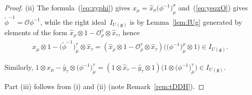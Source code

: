 \documentclass[pdftex]{sigma}
\def\gg{\mathfrak{g}}
\def\OO{\mathcal{O}}
\numberwithin{equation}{section}
\begin{document}
\begin{proof}
(ii) The formula~(\ref{eq:xyphi}) gives $x_\mu = \hat{x}_\sigma \big(\phi^{-1}\big)^\sigma_\mu$ and~(\ref{eq:yeqxO}) gives $\tilde\phi^{-1} = \mathcal{O}\phi^{-1}$, while the right ideal~$I_{U(\gg)}$ is by Lemma~\ref{lem:IUg} generated by elements of the form $\hat{x}_\rho\otimes 1 - \mathcal{O}^\tau_\rho\otimes\hat{x}_\tau$, hence
\begin{gather*}
x_\mu\otimes 1 - \big(\tilde\phi^{-1}\big)^\tau_\mu\otimes\hat{x}_\tau = (\hat{x}_\rho\otimes 1 - \OO^\tau_\rho\otimes\hat{x}_\tau)\big(\big(\phi^{-1}\big)^\rho_\mu\otimes 1\big)\in I_{U(\gg)}.\end{gather*}

Similarly, $1\otimes x_\mu - \hat{y}_\tau\otimes\big(\phi^{-1}\big)^\tau_\mu = (1\otimes \hat{x}_\tau - \hat{y}_\tau\otimes 1)\big(1\otimes\big(\phi^{-1}\big)^\tau_\mu\big)\in I_{U(\gg)}$.

Part (iii) follows from (i) and (ii) (note Remark~\ref{rem:tDDH}).
\end{proof}
\end{document}
